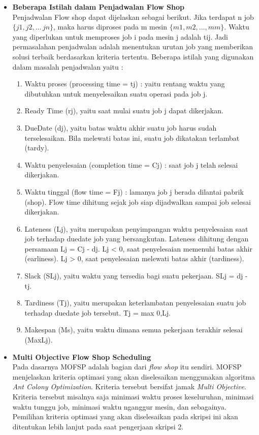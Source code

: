 \documentclass[a4paper,twoside]{article}
\begin{document}
\begin{enumerate}
	
		\begin{itemize}
			\item{\bf Beberapa Istilah dalam Penjadwalan Flow Shop}\\
			Penjadwalan Flow shop dapat dijelaskan sebagai berikut. Jika terdapat n job $\{j1, j2, \dots\, jn\}$, maka harus diproses pada m mesin $\{m1, m2, \dots, mm\}$. Waktu yang diperlukan untuk memproses job i pada mesin j adalah tij. Jadi permasalahan penjadwalan adalah menentukan urutan job yang memberikan solusi terbaik berdasarkan kriteria tertentu. Beberapa istilah yang digunakan dalam masalah penjadwalan yaitu :
			\begin{enumerate}
				\item Waktu proses (processing time = tj) : yaitu rentang waktu yang dibutuhkan untuk menyelesaikan suatu operasi pada job j.
				\item Ready Time (rj), yaitu saat mulai suatu job j dapat dikerjakan.
				\item DueDate (dj), yaitu batas waktu akhir suatu job harus sudah terselesaikan. Bila melewati batas ini, suatu job dikatakan terlambat (tardy).
				\item Waktu penyelesaian (completion time = Cj) : saat job j telah selesai dikerjakan.
				\item Waktu tinggal (flow time = Fj) : lamanya job j berada dilantai pabrik (shop). Flow time dihitung sejak job siap dijadwalkan sampai job selesai dikerjakan.
				\item Lateness (Lj), yaitu merupakan penyimpangan waktu penyelesaian saat job terhadap duedate job yang bersangkutan. Lateness dihitung dengan persamaan Lj = Cj - dj.
				Lj < 0, saat penyelesaian memenuhi batas akhir (earliness).
				Lj > 0, saat penyelesaian melewati batas akhir (tardiness).
				\item Slack (SLj), yaitu waktu yang tersedia bagi suatu pekerjaan.
				SLj = dj - tj.
				\item Tardiness (Tj), yaitu merupakan keterlambatan penyelesaian suatu job  terhadap duedate job tersebut.
				Tj = max {0,Lj}.
				\item Makespan (Ms), yaitu waktu dimana semua pekerjaan terakhir selesai (MaxLj).
			\end{enumerate}
		\end{itemize}
	
		
	
	
		\begin{itemize}
		\item {\bf Multi Objective Flow Shop Scheduling}\\
		Pada dasarnya MOFSP adalah bagian dari {\it flow shop } itu sendiri. MOFSP menjelaskan kriteria optimasi yang akan diselesaikan menggunakan algoritma {\it Ant Colony Optimization}. Kriteria tersebut bersifat jamak {\it Multi Objective}. Kriteria tersebut misalnya saja minimasi waktu proses keseluruhan, minimasi waktu tunggu job, minimasi waktu nganggur mesin, dan sebagainya. Pemilihan kriteria optimasi yang akan diselesaikan pada skripsi ini akan ditentukan lebih lanjut pada saat pengerjaan skripsi 2.
		

\end{itemize}
\end{enumerate}
\end{document}
